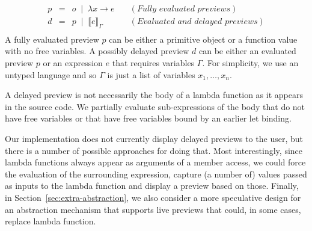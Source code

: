 \documentclass[acmsmall,anonymous,fleqn]{acmart}\settopmatter{printfolios=false,printccs=false,printacmref=false}
\theoremstyle{plain}
\theoremstyle{definition}
\newcommand{\lsep}{\;\;|\;\;}
\begin{document}
\begin{equation*}
\begin{array}{rcll}
p&=&o \lsep  \lambda x\rightarrow e&\quad(\textit{Fully evaluated previews})\\
d&=&p \lsep  \llbracket e \rrbracket_\Gamma&\quad(\textit{Evaluated and delayed previews})\\
\end{array}
\end{equation*}
%
A fully evaluated preview $p$ can be either a primitive object or a function value with no free
variables. A possibly delayed preview $d$ can be either an evaluated preview $p$ or an expression
$e$ that requires variables $\Gamma$. For simplicity, we use an untyped language and so $\Gamma$
is just a list of variables $x_1, \ldots, x_n$.

A delayed preview is not necessarily the body of a lambda function as it appears in the source
code. We partially evaluate sub-expressions of the body that do not have free variables or that
have free variables bound by an earlier let binding.

Our implementation does not currently display
delayed previews to the user, but there is a number of possible approaches for doing that.
Most interestingly, since lambda functions always appear as arguments of a member access, we could
force the evaluation of the surrounding expression, capture (a number of) values passed as inputs
to the lambda function and display a preview based on those. Finally, in Section~\ref{sec:extra-abstraction},
we also consider a more speculative design for an abstraction mechanism that supports live previews
that could, in some cases, replace lambda function.

\end{document}
